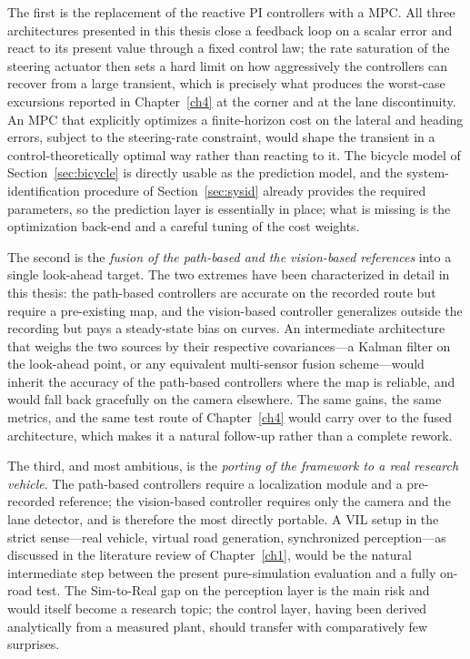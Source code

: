The first is the replacement of the reactive PI controllers with a \ac{MPC}. All three architectures presented in this thesis close a feedback loop on a scalar error and react to its present value through a fixed control law; the rate saturation of the steering actuator then sets a hard limit on how aggressively the controllers can recover from a large transient, which is precisely what produces the worst-case excursions reported in Chapter~\ref{ch4} at the corner and at the lane discontinuity. An \acs{MPC} that explicitly optimizes a finite-horizon cost on the lateral and heading errors, subject to the steering-rate constraint, would shape the transient in a control-theoretically optimal way rather than reacting to it. The bicycle model of Section~\ref{sec:bicycle} is directly usable as the prediction model, and the system-identification procedure of Section~\ref{sec:sysid} already provides the required parameters, so the prediction layer is essentially in place; what is missing is the optimization back-end and a careful tuning of the cost weights.

The second is the \emph{fusion of the path-based and the vision-based references} into a single look-ahead target. The two extremes have been characterized in detail in this thesis: the path-based controllers are accurate on the recorded route but require a pre-existing map, and the vision-based controller generalizes outside the recording but pays a steady-state bias on curves. An intermediate architecture that weighs the two sources by their respective covariances---a Kalman filter on the look-ahead point, or any equivalent multi-sensor fusion scheme---would inherit the accuracy of the path-based controllers where the map is reliable, and would fall back gracefully on the camera elsewhere. The same gains, the same metrics, and the same test route of Chapter~\ref{ch4} would carry over to the fused architecture, which makes it a natural follow-up rather than a complete rework.

The third, and most ambitious, is the \emph{porting of the framework to a real research vehicle}. The path-based controllers require a localization module and a pre-recorded reference; the vision-based controller requires only the camera and the lane detector, and is therefore the most directly portable. A \ac{VIL} setup in the strict sense---real vehicle, virtual road generation, synchronized perception---as discussed in the literature review of Chapter~\ref{ch1}, would be the natural intermediate step between the present pure-simulation evaluation and a fully on-road test. The Sim-to-Real gap on the perception layer is the main risk and would itself become a research topic; the control layer, having been derived analytically from a measured plant, should transfer with comparatively few surprises.

